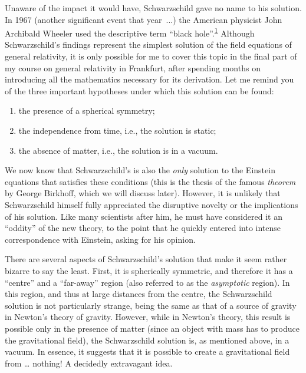 Unaware of the impact it would have, Schwarzschild gave no name to his
solution. In 1967 (another significant event that year~...) the
American physicist John Archibald Wheeler used the descriptive term ``black
hole''.\textsuperscript{\hyperlink{note:06-01}{1}} Although Schwarzschild's findings represent
the simplest solution of the field equations of general relativity, it is only possible
for me to cover this topic in the final part of my course on general relativity in
Frankfurt, after spending months on introducing all the mathematics necessary for its
derivation. Let me remind you of the three important hypotheses under which this
solution can be found:

\begin{enumerate}
\item the presence of a spherical symmetry;

\item the independence from time, i.e., the solution is static;

\item the absence of matter, i.e., the solution is in a vacuum.
\end{enumerate}

We now know that Schwarzschild's is also the \emph{only} solution to the Einstein
equations that satisfies these conditions (this is the thesis of the famous
\emph{theorem} by George Birkhoff, which we will discuss later).
However, it is unlikely that Schwarzschild himself fully appreciated the disruptive
novelty or the implications of his solution. Like many scientists after him, he must
have considered it an ``oddity'' of the new theory, to the point that he quickly entered
into intense correspondence with Einstein, asking for his opinion.

There are several aspects of Schwarzschild's solution that make it seem rather bizarre
to say the least. First, it is spherically symmetric, and therefore it has a ``centre''
and a ``far-away'' region (also referred to as the \emph{asymptotic}
region). In this region, and thus at large distances from the centre, the Schwarzschild
solution is not particularly strange, being the same as that of a source of gravity in
Newton's theory of gravity. However, while in Newton's theory, this result is possible
only in the presence of matter (since an object with mass has to produce the
gravitational field), the Schwarzschild solution is, as mentioned above, in a
vacuum. In essence, it suggests that it is possible to create a
gravitational field from \ldots{} nothing! A decidedly extravagant idea.


